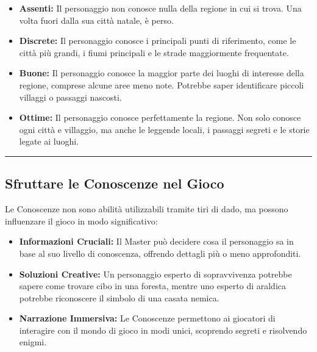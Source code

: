 \documentclass[../manuale_main.tex]{subfiles}
\begin{document}
\begin{itemize}
    \item \textbf{Assenti:} Il personaggio non conosce nulla della regione in cui si trova. Una volta fuori dalla sua città natale, è perso.
    
    \item \textbf{Discrete:} Il personaggio conosce i principali punti di riferimento, come le città più grandi, i fiumi principali e le strade maggiormente frequentate.
    
    \item \textbf{Buone:} Il personaggio conosce la maggior parte dei luoghi di interesse della regione, comprese alcune aree meno note. Potrebbe saper identificare piccoli villaggi o passaggi nascosti.
    
    \item \textbf{Ottime:} Il personaggio conosce perfettamente la regione. Non solo conosce ogni città e villaggio, ma anche le leggende locali, i passaggi segreti e le storie legate ai luoghi.
\end{itemize}

\vspace{0.5cm}
\rule{\textwidth}{0.4pt}
\vspace{0.5cm}

\subsection{Sfruttare le Conoscenze nel Gioco}
Le Conoscenze non sono abilità utilizzabili tramite tiri di dado, ma possono influenzare il gioco in modo significativo:

\begin{itemize}
    \item \textbf{Informazioni Cruciali:} Il Master può decidere cosa il personaggio sa in base al suo livello di conoscenza, offrendo dettagli più o meno approfonditi.
    
    \item \textbf{Soluzioni Creative:} Un personaggio esperto di sopravvivenza potrebbe sapere come trovare cibo in una foresta, mentre uno esperto di araldica potrebbe riconoscere il simbolo di una casata nemica.
    
    \item \textbf{Narrazione Immersiva:} Le Conoscenze permettono ai giocatori di interagire con il mondo di gioco in modi unici, scoprendo segreti e risolvendo enigmi.
\end{itemize}
\end{document}

